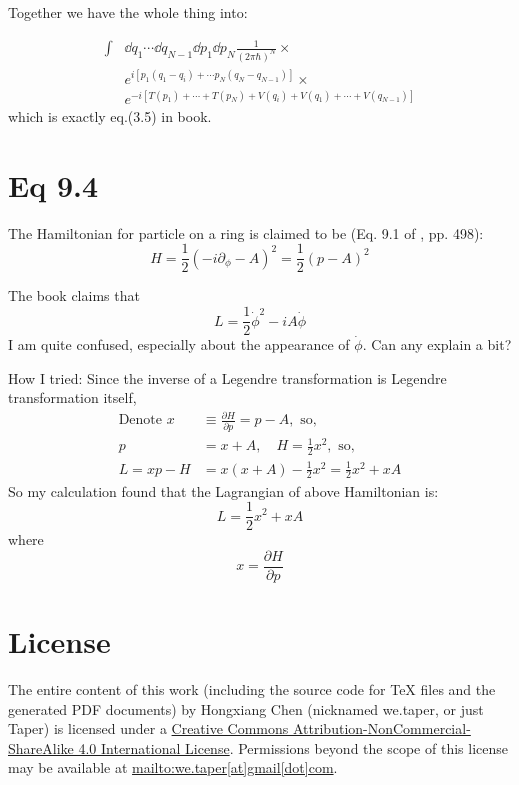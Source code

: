 \documentclass{article}
\begin{document}
Together we have the whole thing into:

\begin{align}
    \int & \dd{q_1}\cdots\dd{q_{N-1}}\dd{p_1}\dd{p_N} \frac{1}{(2\pi\hbar)^N}
    \times \nonumber\\
  & e^{i\left[p_1(q_1-q_i)+\cdots p_N(q_N-q_{N-1})\right]} \times\nonumber\\
  & e^{-i\left[T(p_1)+\cdots+T(p_N)+V(q_i)+V(q_1)+\cdots+V(q_{N-1})\right]}
\end{align}
which is exactly eq.(3.5) in book.
\section{Eq 9.4}

The Hamiltonian for particle on a ring is claimed to be (Eq. 9.1 of
\cite{Altland2010}, pp. 498):
\begin{equation}
    H = \frac{1}{2}(-i\partial_\phi -A)^2 = \frac{1}{2}(p-A)^2
\end{equation}

The book \cite{Altland2010} claims that 
\begin{equation}
    L = \frac{1}{2}\dot{\phi}^2 - iA \dot{\phi}
\end{equation}
I am quite confused, especially about the appearance of $\dot{\phi}$. Can any explain
a bit?

How I tried: Since the inverse of a Legendre transformation is Legendre
transformation itself, 
\begin{align}
    \text{Denote }x &\equiv \frac{\partial H}{\partial p} = p-A,\text{ so,} \\
    p &= x + A,\quad H = \frac{1}{2}x^2 ,\text{ so,}\\
    L = x p - H &= x(x+A) - \frac{1}{2}x^2 = \frac{1}{2}x^2 + x A 
\end{align}
So my calculation found that the Lagrangian of above Hamiltonian is:
\begin{equation}
    L = \frac{1}{2}x^2 + x A
\end{equation}
where
\begin{equation}
    x = \frac{\partial H}{\partial p}
\end{equation}


{}


\printnomenclature
\section{License}
The entire content of this work (including the source code
for TeX files and the generated PDF documents) by 
Hongxiang Chen (nicknamed we.taper, or just Taper) is
licensed under a 
\href{http://creativecommons.org/licenses/by-nc-sa/4.0/}{Creative 
Commons Attribution-NonCommercial-ShareAlike 4.0 International 
License}. Permissions beyond the scope of this 
license may be available at \url{mailto:we.taper[at]gmail[dot]com}.
\end{document}

